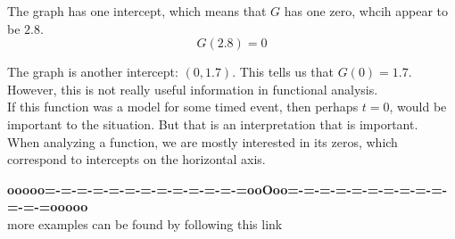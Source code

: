 \documentclass{ximera}
\begin{document}
The graph has one intercept, which means that $G$ has one zero, whcih appear to be $2.8$. \\

\[  G(2.8) = 0  \]




The graph is another intercept: $(0, 1.7)$. This tells us that $G(0)=1.7$.  However, this is not really useful information in functional analysis. \\


If this function was a model for some timed event, then perhaps $t = 0$, would be important to the situation.  But that is an interpretation that is important. \\

When analyzing a function, we are mostly interested in its zeros, which correspond to intercepts on the horizontal axis.






















\begin{center}
\textbf{\textcolor{green!50!black}{ooooo=-=-=-=-=-=-=-=-=-=-=-=-=ooOoo=-=-=-=-=-=-=-=-=-=-=-=-=ooooo}} \\

more examples can be found by following this link\\ 

\end{center}
\end{document}
